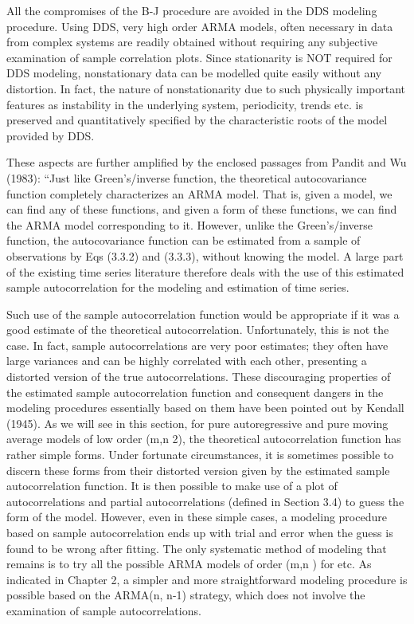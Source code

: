 All the compromises of the B-J procedure are
avoided in the DDS modeling procedure.  Using DDS,
very high order ARMA models, often necessary in
data from complex systems are readily obtained
without requiring any subjective examination of
sample correlation plots.  Since stationarity is
NOT required for DDS modeling, nonstationary data
can be modelled quite easily without any
distortion.  In fact, the nature of
nonstationarity due to such physically important
features as instability in the underlying system,
periodicity, trends etc.  is preserved and
quantitatively specified by the characteristic
roots of the model provided by DDS.
 
These aspects are further amplified by the
enclosed passages from Pandit and Wu (1983):
``Just like Green's/inverse function, the
theoretical autocovariance function completely
characterizes an ARMA model.  That is, given a
model, we can find any of these functions, and
given a form of these functions, we can find the
ARMA model corresponding to it.  However, unlike
the Green's/inverse function, the autocovariance
function can be estimated from a sample of
observations by Eqs (3.3.2) and (3.3.3), without
knowing the model.  A large part of the existing
time series literature therefore deals with the
use of this estimated sample autocorrelation for
the modeling and estimation of time series.
 
Such use of the sample autocorrelation function
would be appropriate if it was a good estimate of
the theoretical autocorrelation.  Unfortunately,
this is not the case.  In fact, sample
autocorrelations are very poor estimates; they
often have large variances and can be highly
correlated with each other, presenting a distorted
version of the true autocorrelations.  These
discouraging properties of the estimated sample
autocorrelation function and consequent dangers in
the modeling procedures essentially based on them
have been pointed out by Kendall (1945).
As we will see in this section, for pure
autoregressive and pure moving average models of
low order (m,n 2), the theoretical autocorrelation
function has rather simple forms.  Under fortunate
circumstances, it is sometimes possible to discern
these forms from their distorted version given by
the estimated sample autocorrelation function.  It
is then possible to make use of a plot of
autocorrelations and partial autocorrelations
(defined in Section 3.4) to guess the form of the
model.  However, even in these simple cases, a
modeling procedure based on sample autocorrelation
ends up with trial and error when the guess is
found to be wrong after fitting.  The only
systematic method of modeling that remains is to
try all the possible ARMA models of order (m,n )
for etc.  As indicated in Chapter 2, a simpler and
more straightforward modeling procedure is
possible based on the ARMA(n, n-1) strategy, which
does not involve the examination of sample
autocorrelations.
 
